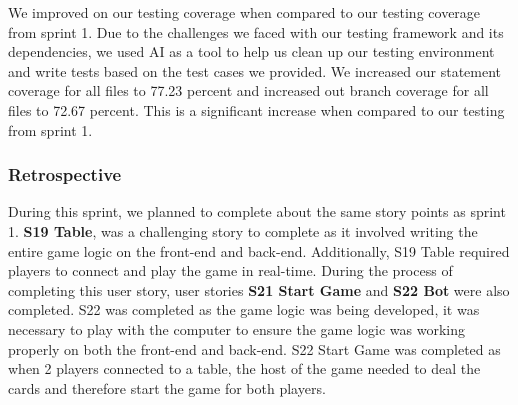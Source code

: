 We improved on our testing coverage when compared to our testing coverage from sprint 1. Due to the challenges we faced with our testing framework and its dependencies, we used AI as a tool to help us clean up our testing environment and write tests based on the test cases we provided. We increased our statement coverage for all files to 77.23 percent and increased out branch coverage for all files to 72.67 percent. This is a significant increase when compared to our testing from sprint 1. 
     

\subsubsection{Retrospective}
During this sprint, we planned to complete about the same story points as sprint 1. \textbf{S19 Table}, was a challenging story to complete as it involved writing the entire game logic on the front-end and back-end. Additionally, S19 Table required players to connect and play the game in real-time. During the process of completing this user story, user stories \textbf{S21 Start Game} and \textbf{S22 Bot} were also completed. S22 was completed as the game logic was being developed, it was necessary to play with the computer to ensure the game logic was working properly on both the front-end and back-end. S22 Start Game was completed as when 2 players connected to a table, the host of the game needed to deal the cards and therefore start the game for both players. 

